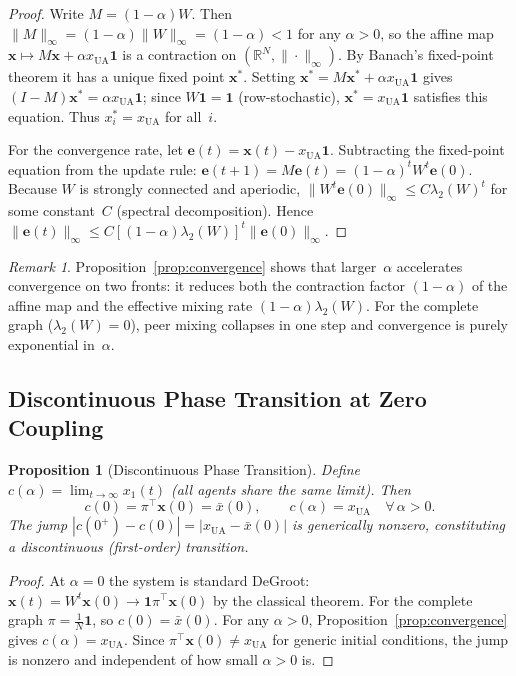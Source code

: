 \documentclass{article}
\theoremstyle{plain}
\newtheorem{proposition}[theorem]{Proposition}
\theoremstyle{definition}
\theoremstyle{remark}
\newtheorem{remark}[theorem]{Remark}
\newcommand{\bx}{\mathbf{x}}
\newcommand{\bone}{\mathbf{1}}
\newcommand{\xUA}{x_{\mathrm{UA}}}
\newcommand{\xbar}{\bar{x}}
\begin{document}
\begin{proof}
Write $M=(1-\alpha)W$.  Then $\|M\|_\infty = (1-\alpha)\|W\|_\infty =
(1-\alpha)<1$ for any $\alpha>0$, so the affine map
$\bx\mapsto M\bx + \alpha\xUA\bone$ is a contraction on
$(\mathbb{R}^N,\|\cdot\|_\infty)$.  By Banach's fixed-point theorem it
has a unique fixed point $\bx^*$.  Setting $\bx^* = M\bx^*+\alpha\xUA\bone$
gives $(I-M)\bx^*=\alpha\xUA\bone$; since $W\bone=\bone$ (row-stochastic),
$\bx^*=\xUA\bone$ satisfies this equation.  Thus $x_i^*=\xUA$ for all~$i$.

For the convergence rate, let $\mathbf{e}(t)=\bx(t)-\xUA\bone$.
Subtracting the fixed-point equation from the update rule:
$\mathbf{e}(t+1)=M\mathbf{e}(t)=(1-\alpha)^t W^t\mathbf{e}(0)$.
Because $W$ is strongly connected and aperiodic, $\|W^t\mathbf{e}(0)\|_\infty
\leq C\lambda_2(W)^t$ for some constant~$C$ (spectral decomposition).
Hence $\|\mathbf{e}(t)\|_\infty\leq C[(1-\alpha)\lambda_2(W)]^t\|\mathbf{e}(0)\|_\infty$.
\end{proof}

\begin{remark}
Proposition~\ref{prop:convergence} shows that larger~$\alpha$ accelerates
convergence on two fronts: it reduces both the contraction factor
$(1-\alpha)$ of the affine map and the effective mixing rate
$(1-\alpha)\lambda_2(W)$.  For the complete graph ($\lambda_2(W)=0$),
peer mixing collapses in one step and convergence is purely exponential
in~$\alpha$.
\end{remark}

\subsection{Discontinuous Phase Transition at Zero Coupling}

\begin{proposition}[Discontinuous Phase Transition]
\label{prop:discontinuous}
Define $c(\alpha)=\lim_{t\to\infty}x_1(t)$ (all agents share the same
limit).  Then
\[
    c(0) = \pi^\top\bx(0) = \xbar(0), \qquad
    c(\alpha) = \xUA \quad \forall\,\alpha>0.
\]
The jump $|c(0^+)-c(0)| = |\xUA - \xbar(0)|$ is generically nonzero,
constituting a discontinuous (first-order) transition.
\end{proposition}

\begin{proof}
At $\alpha=0$ the system is standard DeGroot: $\bx(t)=W^t\bx(0)\to
\bone\pi^\top\bx(0)$ by the classical theorem.  For the complete graph
$\pi=\frac{1}{N}\bone$, so $c(0)=\xbar(0)$.  For any $\alpha>0$,
Proposition~\ref{prop:convergence} gives $c(\alpha)=\xUA$.  Since
$\pi^\top\bx(0)\neq\xUA$ for generic initial conditions, the jump is
nonzero and independent of how small $\alpha>0$ is.
\end{proof}
\end{document}
